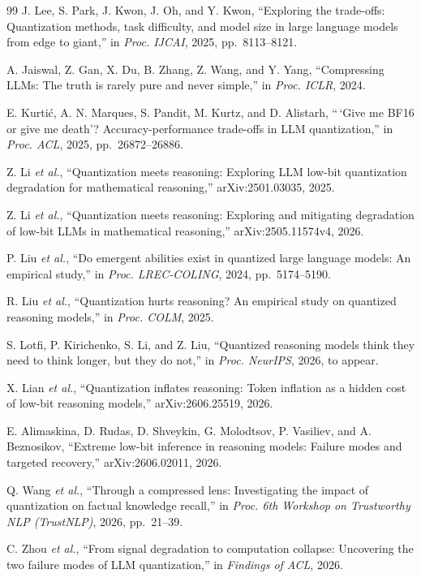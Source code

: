 \documentclass[10pt,twocolumn]{article}
\begin{document}
\begin{thebibliography}{99}
 J. Lee, S. Park, J. Kwon, J. Oh, and Y. Kwon, ``Exploring
the trade-offs: Quantization methods, task difficulty, and model size in
large language models from edge to giant,'' in \emph{Proc. IJCAI},
2025, pp.~8113--8121.

 A. Jaiswal, Z. Gan, X. Du, B. Zhang, Z. Wang, and Y. Yang,
``Compressing LLMs: The truth is rarely pure and never simple,'' in
\emph{Proc. ICLR}, 2024.

 E. Kurtić, A. N. Marques, S. Pandit, M. Kurtz, and D.
Alistarh, ``\,`Give me BF16 or give me death'? Accuracy-performance
trade-offs in LLM quantization,'' in \emph{Proc. ACL}, 2025,
pp.~26872--26886.

 Z. Li \emph{et al.}, ``Quantization meets reasoning:
Exploring LLM low-bit quantization degradation for mathematical
reasoning,'' arXiv:2501.03035, 2025.

 Z. Li \emph{et al.}, ``Quantization meets reasoning:
Exploring and mitigating degradation of low-bit LLMs in mathematical
reasoning,'' arXiv:2505.11574v4, 2026.

 P. Liu \emph{et al.}, ``Do emergent abilities exist in
quantized large language models: An empirical study,'' in \emph{Proc.
LREC-COLING}, 2024, pp.~5174--5190.

 R. Liu \emph{et al.}, ``Quantization hurts reasoning? An
empirical study on quantized reasoning models,'' in \emph{Proc. COLM},
2025.

 S. Lotfi, P. Kirichenko, S. Li, and Z. Liu, ``Quantized
reasoning models think they need to think longer, but they do not,'' in
\emph{Proc. NeurIPS}, 2026, to appear.

 X. Lian \emph{et al.}, ``Quantization inflates reasoning:
Token inflation as a hidden cost of low-bit reasoning models,''
arXiv:2606.25519, 2026.

 E. Alimaskina, D. Rudas, D. Shveykin, G. Molodtsov, P.
Vasiliev, and A. Beznosikov, ``Extreme low-bit inference in reasoning
models: Failure modes and targeted recovery,'' arXiv:2606.02011, 2026.

 Q. Wang \emph{et al.}, ``Through a compressed lens:
Investigating the impact of quantization on factual knowledge recall,''
in \emph{Proc. 6th Workshop on Trustworthy NLP (TrustNLP)}, 2026,
pp.~21--39.

 C. Zhou \emph{et al.}, ``From signal degradation to
computation collapse: Uncovering the two failure modes of LLM
quantization,'' in \emph{Findings of ACL}, 2026.


\end{thebibliography}
\end{document}
